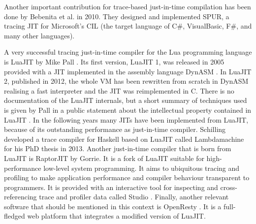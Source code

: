 Another important contribution for trace-based just-in-time compilation has been done by Bebenita et al. \cite{bebenita2010spur} in 2010. They designed and implemented SPUR, a tracing JIT for Microsoft's CIL (the target language of C\#, VisualBasic, F\#, and many other languages).

A very successful tracing just-in-time compiler for the Lua programming language is LuaJIT by Mike Pall \cite{pall2012luajit}. Its first version, LuaJIT 1, was released in 2005 provided with a JIT implemented in the assembly language DynASM \cite{pall2012dynasm, cawleydynasm}. In LuaJIT 2, published in 2012, the whole VM has been rewritten from scratch in DynASM realising a fast interpreter and the JIT was reimplemented in C. There is no documentation of the LuaJIT internals, but a short summary of techniques used is given by Pall in a public statement about the intellectual property contained in LuaJIT \cite{pall2009luajit}. In the following years many JITs have been implemented from LuaJIT, because of its outstanding performance as just-in-time compiler. Schilling developed a trace compiler for Haskell based on LuaJIT called Lambdamachine \cite{schilling2013trace} for his PhD thesis in 2013. Another just-in-time compiler that is born from LuaJIT is RaptorJIT \cite{gorrie2017raptorjit} by Gorrie. It is a fork of LuaJIT  suitable for high-performance low-level system programming. It aims to ubiquitous tracing and profiling to make application performance and compiler behaviour transparent to programmers. It is provided with an interactive tool for inspecting and cross-referencing trace and profiler data called Studio \cite{gorrie2017studio}. Finally, another relevant software that should be mentioned in this context is OpenResty \cite{openresty}. It is a full-fledged web platform that integrates a modified version of LuaJIT.